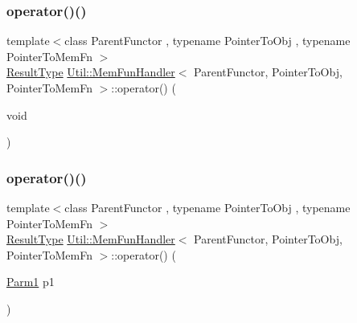 \mbox{\label{classUtil_1_1MemFunHandler_a8dcf5e697b0534283d4a60741d0ca80d}} 
\subsubsection{\texorpdfstring{operator()()}{operator()()}\hspace{0.1cm}{\footnotesize\ttfamily [2/12]}}
{\footnotesize\ttfamily template$<$class Parent\+Functor , typename Pointer\+To\+Obj , typename Pointer\+To\+Mem\+Fn $>$ \\
\mbox{\hyperlink{classUtil_1_1MemFunHandler_a093690dcced95ad48c5429e50006c83e}{Result\+Type}} \mbox{\hyperlink{classUtil_1_1MemFunHandler}{Util\+::\+Mem\+Fun\+Handler}}$<$ Parent\+Functor, Pointer\+To\+Obj, Pointer\+To\+Mem\+Fn $>$\+::operator() (\begin{DoxyParamCaption}\item[{void}]{ }\end{DoxyParamCaption})\hspace{0.3cm}{\ttfamily [inline]}}

\mbox{\label{classUtil_1_1MemFunHandler_a5d20125065c3cc89ca77c0c546923523}} 
\subsubsection{\texorpdfstring{operator()()}{operator()()}\hspace{0.1cm}{\footnotesize\ttfamily [3/12]}}
{\footnotesize\ttfamily template$<$class Parent\+Functor , typename Pointer\+To\+Obj , typename Pointer\+To\+Mem\+Fn $>$ \\
\mbox{\hyperlink{classUtil_1_1MemFunHandler_a093690dcced95ad48c5429e50006c83e}{Result\+Type}} \mbox{\hyperlink{classUtil_1_1MemFunHandler}{Util\+::\+Mem\+Fun\+Handler}}$<$ Parent\+Functor, Pointer\+To\+Obj, Pointer\+To\+Mem\+Fn $>$\+::operator() (\begin{DoxyParamCaption}\item[{\mbox{\hyperlink{classUtil_1_1MemFunHandler_a43182733677fc623d89e5613ecf15761}{Parm1}}}]{p1 }\end{DoxyParamCaption})\hspace{0.3cm}{\ttfamily [inline]}}

